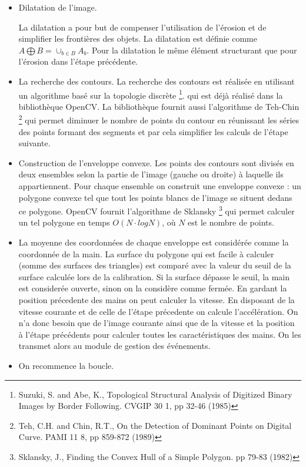 \begin{itemize}
\begin{table}[h]
    \end{table}
    \par L'érosion est utilisée pour le filtrage du bruit, c'est à dire les  petites particules blanches qui peuvent apparaître sur l'image binarisée par hasard. L'érosion est appliquée à l'image deux fois. Le résultat de l'application est la suppression des petites zones blancs (moins de 4 pixels), les zones correspondant aux mains et seulement elles restent sur l'image. La diminution de leur taille de 2 pixels est compensé pendant l'étape suivante.
    \item Dilatation de l'image.
    \par La dilatation a pour but de compenser l'utilisation de l'érosion et de  simplifier les frontières des objets. La dilatation est définie comme $A  \bigoplus B = \cup_{b \in B}A_b$. Pour la dilatation le même élément structurant que pour l'érosion dans l'étape précédente. 
    \item La recherche des contours. La recherche des contours est réalisée en utilisant un algorithme basé sur la topologie discrète \footnote{Suzuki, S. and Abe, K., Topological Structural Analysis of Digitized Binary Images by Border Following. CVGIP 30 1, pp 32-46 (1985)}. qui est déjà réalisé dans la bibliothèque OpenCV. La bibliothèque fournit aussi l'algorithme de Teh-Chin \footnote{Teh, C.H. and Chin, R.T.,  On the Detection of Dominant Points on Digital Curve. PAMI 11 8, pp  859-872 (1989)} qui permet diminuer le nombre de points du contour en réunissant les séries des points formant des segments et par cela simplifier les calculs de l'étape suivante.
    \item Construction de l'enveloppe convexe. Les points des contours sont  divisés en deux ensembles selon la partie de l'image (gauche ou droite) à  laquelle ils appartiennent. Pour chaque ensemble on construit une  enveloppe convexe : un polygone convexe tel que tout les points blancs de l'image se situent dedans ce polygone. OpenCV fournit l'algorithme de Sklansky \footnote{Sklansky, J.,  Finding the Convex Hull of a Simple Polygon. pp 79-83 (1982)} qui permet calculer un tel polygone en temps $O(N \cdot log N)$, où $N$ est le nombre de points.
    \item La moyenne des coordonnées de chaque enveloppe est considérée comme la  coordonnée de la main. La surface du polygone qui est facile à calculer (somme des surfaces des triangles) est comparé avec la valeur du seuil de la surface calculée lors de la calibration. Si la surface dépasse le seuil, la main est considerée ouverte, sinon on la considère comme fermée. En gardant la position précedente des mains on peut calculer la vitesse. En disposant de la vitesse courante et de celle de l'étape précedente on calcule l'accélération. On n'a donc besoin que de l'image courante ainsi que de la vitesse et la position à l'étape précédents pour calculer toutes les caractéristiques des mains. On les transmet alors au module de gestion des événements.
    \item On recommence la boucle.
\end{itemize}
